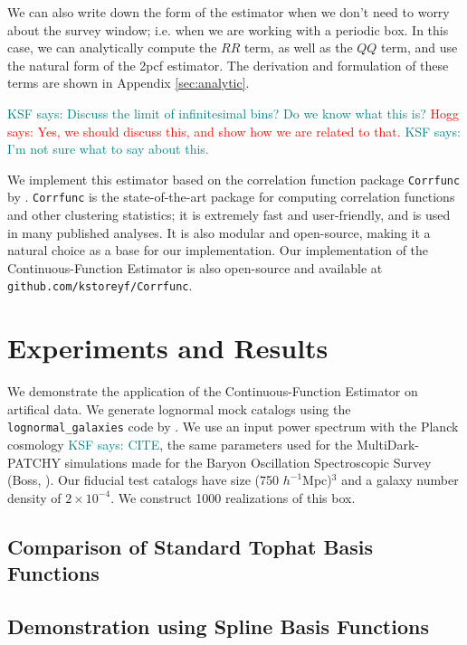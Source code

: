 \documentclass[modern]{aastex62}
\newcommand{\cf}{2pcf\xspace} %
\newcommand{\est}{the Continuous-Function Estimator\xspace}
\newcommand{\hmpc}{$h^{-1}$Mpc}
\newcommand{\KSF}[1]{\textcolor{teal}{KSF says: #1}}
\newcommand{\hogg}[1]{\textcolor{red}{Hogg says: #1}}
\begin{document}
We can also write down the form of the estimator when we don't need to worry about the survey window; i.e. when we are working with a periodic box.
In this case, we can analytically compute the $RR$ term, as well as the $QQ$ term, and use the natural form of the \cf estimator.
The derivation and formulation of these terms are shown in Appendix \ref{sec:analytic}.

\KSF{Discuss the limit of infinitesimal bins? Do we know what this is?} \hogg{Yes, we should discuss this, and show how we are related to that.} \KSF{I'm not sure what to say about this.}

We implement this estimator based on the correlation function package \texttt{Corrfunc} by \cite{Sinha2019}.
\texttt{Corrfunc} is the state-of-the-art package for computing correlation functions and other clustering statistics; it is extremely fast and user-friendly, and is used in many published analyses.
It is also modular and open-source, making it a natural choice as a base for our implementation.
Our implementation of \est is also open-source and available at \texttt{github.com/kstoreyf/Corrfunc}.


\section{Experiments and Results}
\label{sec:app}

We demonstrate the application of \est on artifical data.
We generate lognormal mock catalogs \citep{ColesJones1991} using the \texttt{lognormal\_galaxies} code by \citep{Agrawal2017}.
We use an input power spectrum with the Planck cosmology \KSF{CITE}, the same parameters used for the MultiDark-PATCHY simulations \citep{Kitaura2016} made for the Baryon Oscillation Spectroscopic Survey (Boss, \citealt{Dawson2013}).
Our fiducial test catalogs have size (750 \hmpc)$^3$ and a galaxy number density of $2 \times 10^{-4}$.
We construct 1000 realizations of this box.

\subsection{Comparison of Standard Tophat Basis Functions}



\subsection{Demonstration using Spline Basis Functions}
\label{sec:spline}
\end{document}

